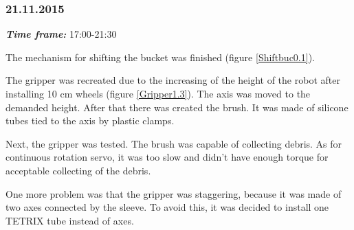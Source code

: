 \subsubsection{21.11.2015}
\textit{\textbf{Time frame:}} 17:00-21:30

The mechanism for shifting the bucket was finished (figure \ref{Shiftbuc0.1}). 

The gripper was recreated due to the increasing of the height of the robot after installing 10 cm wheels (figure \ref{Gripper1.3}). The axis was moved to the demanded height. After that there was created the brush. It was made of silicone tubes tied to the axis by plastic clamps. 

Next, the gripper was tested. The brush was capable of collecting debris. As for continuous rotation servo, it was too slow and didn't have enough torque for acceptable collecting of the debris. 

One more problem was that the gripper was staggering, because it was made of two axes connected by the sleeve. To avoid this, it was decided to install one TETRIX tube instead of axes.


